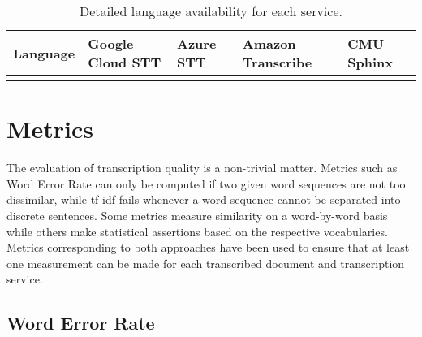 \documentclass[11pt]{article}
\begin{document}
\begin{table}[!ht]
	\centering
	\begin{tabular}{l>{\Centering}m{20mm}>{\Centering}m{20mm}>{\Centering}m{20mm}>{\Centering}m{20mm}}
		\toprule
		Language & Google Cloud STT & Azure STT & Amazon Transcribe & CMU Sphinx \\
		\midrule
		\availabilityTbl
		\bottomrule
	\end{tabular}
	\caption{Detailed language availability for each service.}
  \label{tbl:availability}
\end{table}

\section{Metrics}

The evaluation of transcription quality is a non-trivial matter. 
Metrics such as Word Error Rate can only be computed if two given word sequences are not too dissimilar, while tf-idf fails whenever a word sequence cannot be separated into discrete sentences.
Some metrics measure similarity on a word-by-word basis while others make statistical assertions based on the respective vocabularies.
Metrics corresponding to both approaches have been used to ensure that at least one measurement can be made for each transcribed document and transcription service.

\subsection*{Word Error Rate}
\end{document}
